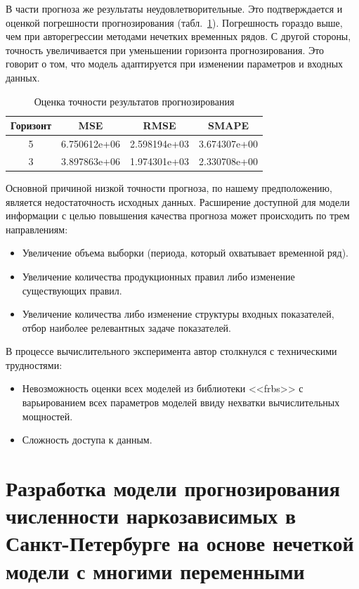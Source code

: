 В части прогноза же результаты неудовлетворительные. Это подтверждается и оценкой погрешности прогнозирования (табл.~\ref{table:WM-error}). Погрешность гораздо выше, чем при авторегрессии методами нечетких временных рядов. С другой стороны, точность увеличивается при уменьшении горизонта прогнозирования. Это говорит о том, что модель адаптируется при изменении параметров и входных данных. 

\begin{table}[bhtp]
	\caption{Оценка точности результатов прогнозирования}
    \begin{tabular}{ | c | c | c | c | }
        \hline
        Горизонт & MSE & RMSE & SMAPE \\
        \hline
        5 & 6.750612e+06 & 2.598194e+03 & 3.674307e+00  \\
        \hline
        3 & 3.897863e+06 & 1.974301e+03 & 2.330708e+00  \\
        \hline
    \end{tabular}		
	\label{table:WM-error}	
\end{table}

Основной причиной низкой точности прогноза, по нашему предположению, является недостаточность исходных данных. Расширение доступной для модели информации с целью повышения качества прогноза может происходить по трем направлениям:
\begin{itemize}
	\item Увеличение объема выборки (периода, который охватывает временной ряд).
	\item Увеличение количества продукционных правил либо изменение существующих правил.
	\item Увеличение количества либо изменение структуры входных показателей, отбор наиболее релевантных задаче показателей.
\end{itemize}

В процессе вычислительного эксперимента автор столкнулся с техническими трудностями:
\begin{itemize}
	\item Невозможность оценки всех моделей из библиотеки <<frbs>> с варьированием всех параметров моделей ввиду нехватки вычислительных мощностей.
	\item Сложность доступа к данным.  
\end{itemize}
	

\section{Разработка модели прогнозирования численности наркозависимых в 
    Санкт-Петербурге на основе нечеткой модели с многими переменными}

